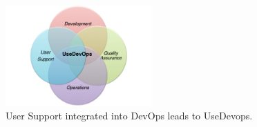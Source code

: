\begin{figure}[htb]
  \centering
    \includegraphics[width=0.5\textwidth]{images/usedevops.pdf}
  \caption{User Support integrated into DevOps leads to UseDevops.}
  \label{F:usedevops}
\end{figure}











